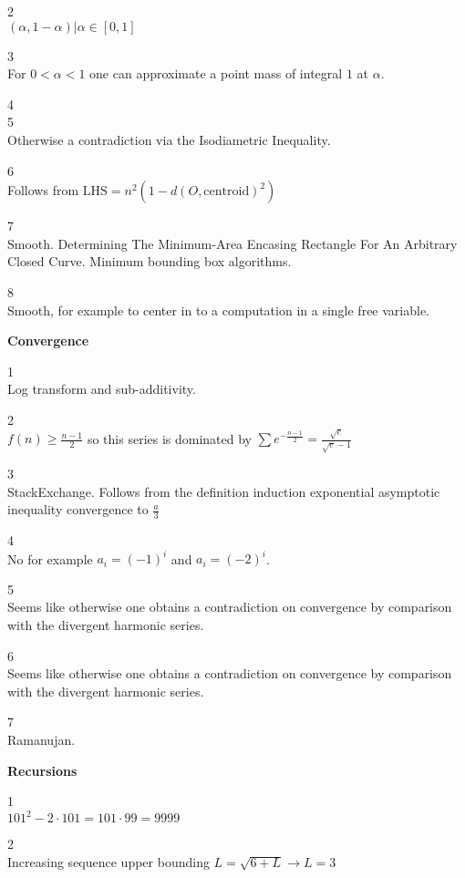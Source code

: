 2 \\
$\boxed{(\alpha,1-\alpha)| \alpha \in [0,1]}$

3 \\
For $0<\alpha<1$ one can approximate a point mass of integral $1$ at $\alpha$.

4 \\


5 \\
Otherwise a contradiction via the Isodiametric Inequality.

6 \\
Follows from $\text{LHS}=n^2(1-d(O,\text{centroid})^2)$

7 \\
Smooth. Determining The Minimum-Area Encasing Rectangle For An Arbitrary Closed Curve. Minimum bounding box algorithms.

8 \\
Smooth, for example to center in to a computation in a single free variable.

\newpage

\textbf{Convergence}

1 \\
Log transform and sub-additivity.

2 \\
$f(n) \ge \frac{n-1}{2}$ so this series is dominated by $\sum e^{-\frac{n-1}{2}}=\frac{\sqrt{e}}{\sqrt{e}-1}$

3 \\
StackExchange. Follows from the definition induction exponential asymptotic inequality convergence to $\frac{a}{3}$

4 \\
No for example $a_i=(-1)^i$ and $a_i=(-2)^i$.

5 \\
Seems like otherwise one obtains a contradiction on convergence by comparison with the divergent harmonic series.

6 \\
Seems like otherwise one obtains a contradiction on convergence by comparison with the divergent harmonic series.

7 \\
Ramanujan.

\newpage

\textbf{Recursions}

1 \\
$101^2-2\cdot 101=101\cdot 99=\boxed{9999}$

2 \\
Increasing sequence upper bounding $L=\sqrt{6+L} \to L=\boxed{3}$

